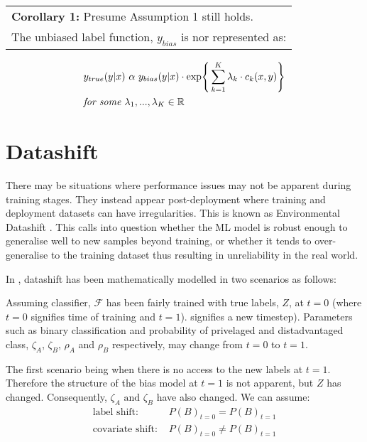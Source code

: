 \bigskip
\begin{center}
    \begin{tabular}{l}
        \textbf{Corollary 1: } Presume Assumption 1 still holds. \\
        The unbiased label function, $y_{bias}$ is nor represented as:
    \end{tabular}

    \begin{equation}
        \label{eq:Corollary}
        \begin{split}
            & y_{true}(y|x) \text{ }\alpha \text{ } y_{bias}(y|x) \cdot \text{exp} \Bigg\{ \sum^K_{k=1} \lambda_k \cdot c_k(x,y)\Bigg\} \\
            & \textit{for some } \lambda_1, ..., \lambda_K \in \mathbb{R}
        \end{split}
    \end{equation}
\end{center}

\section*{Datashift}
There may be situations where performance issues may not be apparent during training stages. 
They instead appear post-deployment where training and deployment datasets can have irregularities. 
This is known as Environmental Datashift \cite{saria2019tutorial}. 
This calls into question whether the ML model is robust enough to generalise well to new samples beyond training, or whether it tends to over-generalise to the training dataset thus resulting in unreliability in the real world.

In \cite{shift}, datashift has been mathematically modelled in two scenarios as follows:

Assuming classifier, $\mathcal{F}$ has been fairly trained with true labels, $Z$, at $t = 0$ (where $t = 0$ signifies time of training and $t = 1$). signifies a new timestep).
Parameters such as binary classification and probability of privelaged and distadvantaged class, $\zeta_A$,  $\zeta_B$, $\rho_A$ and $\rho_B$ respectively,
may change from  $t = 0$ to $t = 1$.

The first scenario being when there is no access to the new labels at $t = 1$. 
Therefore the structure of the bias model at $t = 1$ is not apparent, but $Z$ has changed.
Consequently, $\zeta_A \text{ and } \zeta_B$ have also changed. 
We can assume:
\begin{align*}
    \text{label shift: } & P(B)_{t=0} = P(B)_{t=1} \\
    \text{covariate shift: } & P(B)_{t=0} \neq P(B)_{t=1}
\end{align*}

